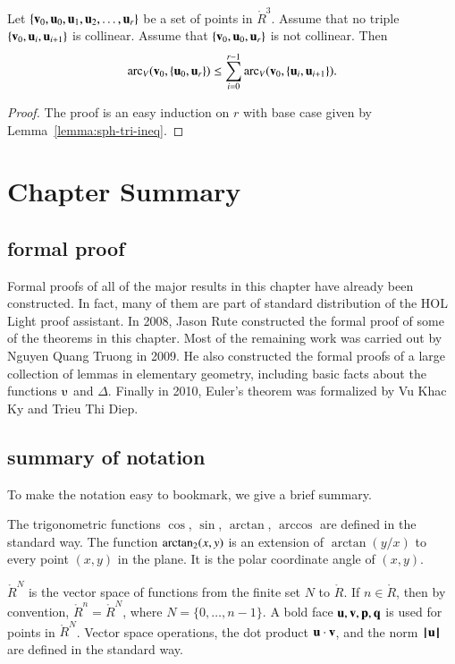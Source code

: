 \begin{lemma}[]
\label{lemma:sph-tri-multi}
Let $\{{\mathbf v}_0,{\mathbf u}_0,{\mathbf u}_1,{\mathbf u}_2,\ldots,{\mathbf u}_r\}$ be a set of points in
$\ring{R}^3$.  Assume that no triple $\{{\mathbf v}_0,{\mathbf u}_i,{\mathbf u}_{i+1}\}$ is
collinear.  Assume that $\{{\mathbf v}_0,{\mathbf u}_0,{\mathbf u}_r\}$ is not collinear.  Then
\[ 
  \operatorname{arc}_V({\mathbf v}_0,\{{\mathbf u}_0,{\mathbf u}_r\}) \le \sum_{i=0}^{r-1} \operatorname{arc}_V({\mathbf v}_0,\{{\mathbf u}_i,{\mathbf u}_{i+1}\}).
\] 
\end{lemma}

\begin{proof} The proof is an easy induction on $r$ with base case given by
  Lemma~\ref{lemma:sph-tri-ineq}.
\end{proof}


\section{Chapter Summary}

\subsection{formal proof}

Formal proofs of all of the major results in this chapter have already
been constructed.  In fact, many of them are part of standard
distribution of the HOL Light proof assistant.  In 2008, Jason Rute
constructed the formal proof of some of the theorems in this chapter.
Most of the remaining work was carried out by Nguyen Quang Truong in
2009.  He also constructed the formal proofs of a large collection of
lemmas in elementary geometry, including basic facts about the
functions $\ups$ and $\Delta$.  Finally in 2010, Euler's theorem was
formalized by Vu Khac Ky and Trieu Thi Diep.

\subsection{summary of notation}

To make the notation easy to bookmark, 
we give a brief summary.

The trigonometric functions $\cos$, $\sin$, $\arctan$, $\arccos$ are defined in the
standard way.  The function ${\operatorname{arctan_2}}(x,y)$ is an extension of $\arctan(y/x)$ to every point $(x,y)$
in the plane.  It is the polar coordinate angle of $(x,y)$.

 $\ring{R}^N$ is the vector space of functions from the finite set $N$ to $\ring{R}$.  If
$n\in\ring{R}$,   then by convention, $\ring{R}^n = \ring{R}^N$, where $N=\{0,\ldots,n-1\}$.
A bold face ${\mathbf u},{\mathbf v},{\mathbf p},{\mathbf q}$ is used for points in $\ring{R}^N$.   Vector space operations, the
dot product ${\mathbf u}\cdot {\mathbf v}$, and the norm ${{\hskip0.1em|\hskip-0.15em|\hskip0.1em}{\mathbf u}{\hskip0.1em|\hskip-0.15em|\hskip0.1em}}$ are defined in the standard way.

